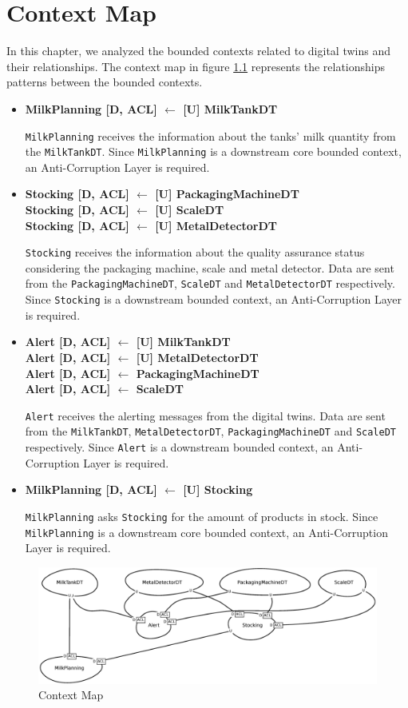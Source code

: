 \chapter{Context Map}
In this chapter, we analyzed the bounded contexts related to digital twins and their relationships.
The context map in figure \ref{img:context-map} represents the relationships patterns between the bounded contexts.

\begin{itemize}
    \item \textbf{MilkPlanning [D, ACL] $\leftarrow$ [U] MilkTankDT}
    
    \texttt{MilkPlanning} receives the information about the tanks' milk quantity from the \texttt{MilkTankDT}.
    Since \texttt{MilkPlanning} is a downstream core bounded context, an Anti-Corruption Layer is required.
    
    \item \textbf{Stocking [D, ACL] $\leftarrow$ [U] PackagingMachineDT \\ 
    Stocking [D, ACL] $\leftarrow$ [U] ScaleDT \\ 
    Stocking [D, ACL] $\leftarrow$ [U] MetalDetectorDT}

    \texttt{Stocking} receives the information about the quality assurance status considering the packaging machine, scale and metal detector. Data are sent from the \texttt{PackagingMachineDT}, \texttt{ScaleDT} and \texttt{MetalDetectorDT} respectively.
    Since \texttt{Stocking} is a downstream bounded context, an Anti-Corruption Layer is required.
	
	\item \textbf{Alert [D, ACL] $\leftarrow$ [U] MilkTankDT \\
	Alert [D, ACL] $\leftarrow$ [U] MetalDetectorDT \\
	Alert [D, ACL] $\leftarrow$ PackagingMachineDT \\
	Alert [D, ACL] $\leftarrow$ ScaleDT}

    \texttt{Alert} receives the alerting messages from the digital twins. Data are sent from the \texttt{MilkTankDT}, \texttt{MetalDetectorDT}, \texttt{PackagingMachineDT} and \texttt{ScaleDT} respectively.
    Since \texttt{Alert} is a downstream bounded context, an Anti-Corruption Layer is required.

    \item \textbf{MilkPlanning [D, ACL] $\leftarrow$  [U] Stocking} 
    
    \texttt{MilkPlanning} asks \texttt{Stocking} for the amount of products in stock.
    Since \texttt{MilkPlanning} is a downstream core bounded context, an Anti-Corruption Layer is required.

\end{itemize}

\begin{figure}[H]
    \centering
    \includegraphics[width=\textwidth]{img/contextMap.eps}
    \caption{Context Map}
    \label{img:context-map}
\end{figure}


